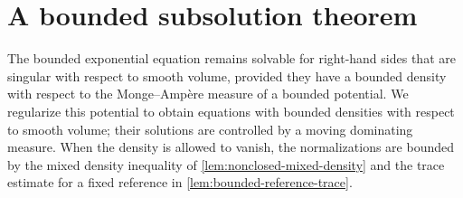 \section{A bounded subsolution theorem}

The bounded exponential equation remains solvable for right-hand sides that are singular with respect to smooth volume, provided they have a bounded density with respect to the Monge--Amp\`ere measure of a bounded potential. We regularize this potential to obtain equations with bounded densities with respect to smooth volume; their solutions are controlled by a moving dominating measure. When the density is allowed to vanish, the normalizations are bounded by the mixed density inequality of \cref{lem:nonclosed-mixed-density} and the trace estimate for a fixed reference in \cref{lem:bounded-reference-trace}.

